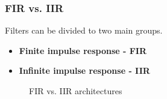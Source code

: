 \documentclass[10pt,pdflatex,headrule,landscape]{beamer}
\begin{document}
\begin{frame}
\frametitle{FIR vs. IIR}
\begin{minipage}{0.59\textwidth}
Filters can be divided to two main groups. 
\begin{itemize}
\item{
\textbf{Finite impulse response - FIR}
}
\item{
\textbf{Infinite impulse response - IIR}
}
\end{itemize}
\end{minipage}
\begin{minipage}{0.4\textwidth}
\begin{figure}
\centering
{}
\qquad
{}
\caption{FIR vs. IIR architectures}
\label{fig:FIRvsIIRArch}
\end{figure}
\end{minipage}
\end{frame}
\end{document}
